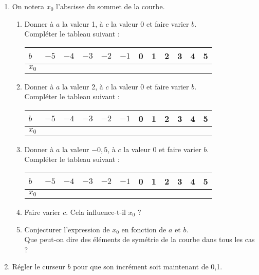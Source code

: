 \documentclass[11pt]{article}
\begin{document}
\begin{exercice}
\begin{enumerate}
\begin{enumerate}
       \end{enumerate}
 \item	On notera $x_0$ l'abscisse du sommet de la courbe.
	\begin{enumerate}
        \item Donner à $a$ la valeur 1, à $c$ la valeur 0 et faire varier $b$.\\
	Compléter le tableau suivant :
	\begin{center}
	  \begin{tabular}{m{0.7cm}*{11}{|m{0.5cm}}}
	  \centering $b$ & $-5$ & $-4$ & $-3$ & $-2$ & $-1$ & 0 & 1 & 2 & 3 & 4 & 5 \\ \hline
	  \centering $x_0$ &&&&&&&&&&& \\
	  \end{tabular}
	\end{center}
	\item Donner à $a$ la valeur 2, à $c$ la valeur 0 et faire varier $b$.\\
	Compléter le tableau suivant :
	\begin{center}
	  \begin{tabular}{m{0.7cm}*{11}{|m{0.5cm}}}
	  \centering $b$ & $-5$ & $-4$ & $-3$ & $-2$ & $-1$ & 0 & 1 & 2 & 3 & 4 & 5 \\ \hline
	  \centering $x_0$ &&&&&&&&&&& \\
	  \end{tabular}
	\end{center}
	\item Donner à $a$ la valeur $-0,5$, à $c$ la valeur 0 et faire varier $b$.\\
	Compléter le tableau suivant :
	\begin{center}
	  \begin{tabular}{m{0.7cm}*{11}{|m{0.5cm}}}
	  \centering $b$ & $-5$ & $-4$ & $-3$ & $-2$ & $-1$ & 0 & 1 & 2 & 3 & 4 & 5 \\ \hline
	  \centering $x_0$ &&&&&&&&&&& \\
	  \end{tabular}
	\end{center}
	\item Faire varier $c$. Cela influence-t-il $x_0$ ?
	\item Conjecturer l'expression de $x_0$ en fonction de $a$ et $b$.\\
	      Que peut-on dire des éléments de symétrie de la courbe dans tous les cas ?
       \end{enumerate}
       \item Régler le curseur $b$ pour que son incrément soit maintenant de 0,1.\\

\end{enumerate}
\end{exercice}
\end{document}

